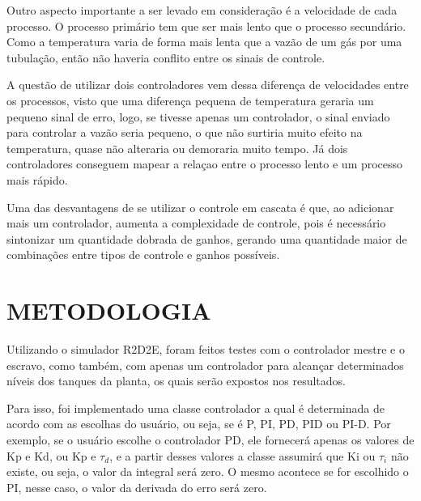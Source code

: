 \documentclass[a4paper,12pt]{article}
\begin{document}
Outro aspecto importante a ser levado em consideração é a velocidade de cada processo. O processo primário tem que ser mais lento que o processo secundário. Como a temperatura varia de forma mais lenta que a vazão de um gás por uma tubulação, então não haveria conflito entre os sinais de controle. 

A questão de utilizar dois controladores vem dessa diferença de velocidades entre os processos, visto que uma diferença pequena de temperatura geraria um pequeno sinal de erro, logo, se tivesse apenas um controlador, o sinal enviado para controlar a vazão seria pequeno, o que não surtiria muito efeito na temperatura, quase não alteraria ou demoraria muito tempo. Já dois controladores conseguem mapear a relaçao entre o processo lento e um processo mais rápido. 

Uma das desvantagens de se utilizar o controle em cascata é que, ao adicionar mais um controlador, aumenta a complexidade de controle, pois é necessário sintonizar um quantidade dobrada de ganhos, gerando uma quantidade maior de combinações entre tipos de controle e ganhos possíveis. 




\newpage


\thispagestyle{main}

\section{METODOLOGIA}

\hspace{4ex}Utilizando o simulador R2D2E, foram feitos testes com o controlador mestre e o escravo, como também, com apenas um controlador para alcançar determinados níveis dos tanques da planta, os quais serão expostos nos resultados.

\hspace{4ex}Para isso, foi implementado uma classe controlador a qual é determinada de acordo com as escolhas do usuário, ou seja, se é P, PI, PD, PID ou PI-D. Por exemplo, se o usuário escolhe o controlador PD, ele fornecerá apenas os valores de Kp e Kd, ou Kp e $\tau_d$, e a partir desses valores a classe assumirá que Ki ou $\tau_i$ não existe, ou seja, o valor da integral será zero. O mesmo acontece se for escolhido o PI, nesse caso, o valor da derivada do erro será zero.
\end{document}

